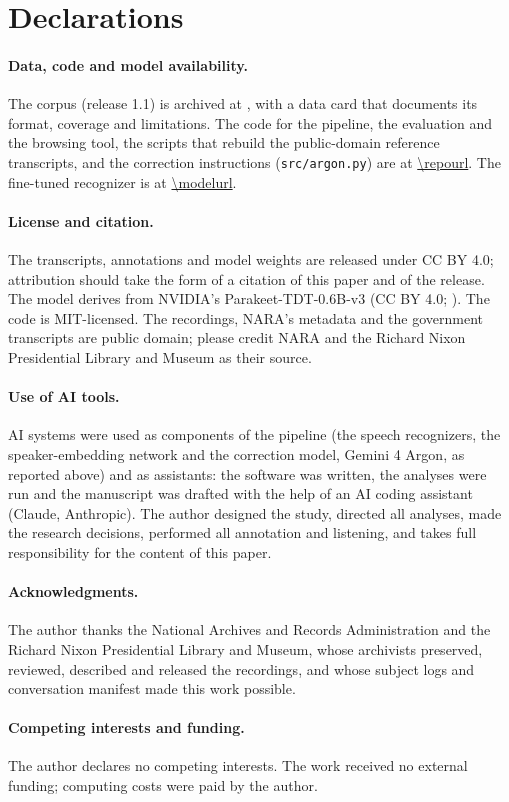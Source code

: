 \section*{Declarations}

\paragraph{Data, code and model availability.} The corpus (release 1.1) is archived at \releasedoi, with a data card that documents its format, coverage and limitations. The code for the pipeline, the evaluation and the browsing tool, the scripts that rebuild the public-domain reference transcripts, and the correction instructions (\texttt{src/argon.py}) are at \url{\repourl}. The fine-tuned recognizer is at \url{\modelurl}.

\paragraph{License and citation.} The transcripts, annotations and model weights are released under CC BY 4.0; attribution should take the form of a citation of this paper and of the release. The model derives from NVIDIA's Parakeet-TDT-0.6B-v3 (CC BY 4.0; \citealp{nvidia2025parakeetv3}). The code is MIT-licensed. The recordings, NARA's metadata and the government transcripts are public domain; please credit NARA and the Richard Nixon Presidential Library and Museum as their source.

\paragraph{Use of AI tools.} AI systems were used as components of the pipeline (the speech recognizers, the speaker-embedding network and the correction model, Gemini 4 Argon, as reported above) and as assistants: the software was written, the analyses were run and the manuscript was drafted with the help of an AI coding assistant (Claude, Anthropic). The author designed the study, directed all analyses, made the research decisions, performed all annotation and listening, and takes full responsibility for the content of this paper.

\paragraph{Acknowledgments.} The author thanks the National Archives and Records Administration and the Richard Nixon Presidential Library and Museum, whose archivists preserved, reviewed, described and released the recordings, and whose subject logs and conversation manifest made this work possible.

\paragraph{Competing interests and funding.} The author declares no competing interests. The work received no external funding; computing costs were paid by the author.
